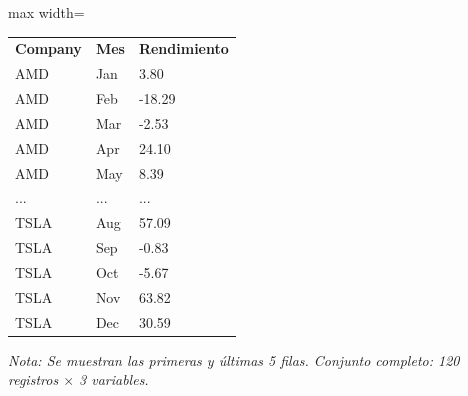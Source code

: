 

\begin{table}[htbp]

\centering

\begin{adjustbox}{max width=\textwidth}

\begin{tabular}{lll}

\rowcolor{ThemeBackground}
\rule{0pt}{0.45cm}
\textcolor{ThemeGold}{\bfseries Company} & \textcolor{ThemeGold}{\bfseries Mes} & \textcolor{ThemeGold}{\bfseries Rendimiento} \\

AMD & Jan & 3.80 \\
AMD & Feb & -18.29 \\
AMD & Mar & -2.53 \\
AMD & Apr & 24.10 \\
AMD & May & 8.39 \\
... & ... & ... \\
TSLA & Aug & 57.09 \\
TSLA & Sep & -0.83 \\
TSLA & Oct & -5.67 \\
TSLA & Nov & 63.82 \\
TSLA & Dec & 30.59 \\
\bottomrule
\end{tabular}

\end{adjustbox}

\vspace{0.15cm}
{\raggedright\sffamily\footnotesize\color{ThemeMuted}
\textit{Nota: Se muestran las primeras y últimas 5 filas. Conjunto completo: 120 registros $\times$ 3 variables.}}

\end{table}
